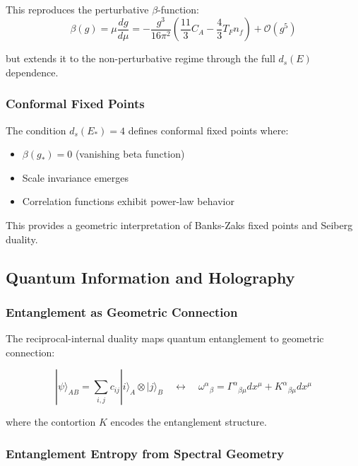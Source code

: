This reproduces the perturbative $\beta$-function:
\begin{equation}
    \beta(g) = \mu\frac{dg}{d\mu} = -\frac{g^3}{16\pi^2}\left(\frac{11}{3}C_A - \frac{4}{3}T_F n_f\right) + \mathcal{O}(g^5)
\end{equation}

but extends it to the non-perturbative regime through the full $d_s(E)$ dependence.

\subsubsection{Conformal Fixed Points}

The condition $d_s(E_*) = 4$ defines conformal fixed points where:
\begin{itemize}
    \item $\beta(g_*) = 0$ (vanishing beta function)
    \item Scale invariance emerges
    \item Correlation functions exhibit power-law behavior
\end{itemize}

This provides a geometric interpretation of Banks-Zaks fixed points and Seiberg duality.

\subsection{Quantum Information and Holography}

\subsubsection{Entanglement as Geometric Connection}

The reciprocal-internal duality maps quantum entanglement to geometric connection:

\begin{equation}
    |\psi\rangle_{AB} = \sum_{i,j} c_{ij} |i\rangle_A \otimes |j\rangle_B \quad \leftrightarrow \quad \omega^{\alpha}{}_{\beta} = \Gamma^{\alpha}{}_{\beta\mu} dx^\mu + K^{\alpha}{}_{\beta\mu} dx^\mu
\end{equation}

where the contortion $K$ encodes the entanglement structure.

\subsubsection{Entanglement Entropy from Spectral Geometry}

